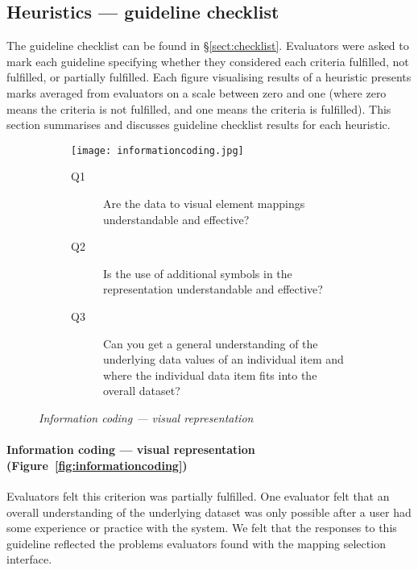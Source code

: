 \subsection{Heuristics --- guideline checklist}

The guideline checklist can be found in \S\ref{sect:checklist}. Evaluators were asked to mark each guideline specifying whether they considered each criteria fulfilled, not fulfilled, or partially fulfilled. Each figure visualising results of a heuristic presents marks averaged from  evaluators on a scale between zero and one (where zero means the criteria is not fulfilled, and one means the criteria is fulfilled). This section summarises and discusses guideline checklist results for each heuristic.

\begin{figure}[!htb]
\centering
\begin{subfigure}{.5\textwidth}
	\centering
	\texttt{[image: informationcoding.jpg]}
\end{subfigure}%
\begin{subfigure}{.5\textwidth}
  \begin{description}
	\item[Q1]Are the data to visual element mappings understandable and effective?
	\item[Q2]Is the use of additional symbols in the representation understandable and effective? 
	\item[Q3]Can you get a general understanding of the underlying data values of an individual item and where the individual data item fits into the overall dataset?
  \end{description}
\end{subfigure}
\caption{\textit{Information coding --- visual representation}}
\label{fig:informationcoding}
\end{figure}

\paragraph{Information coding --- visual representation (Figure~\vref{fig:informationcoding})}

Evaluators felt this criterion was partially fulfilled. One evaluator felt that an overall understanding of the underlying dataset was only possible after a user had some experience or practice with the system. We felt that the responses to this guideline reflected the problems evaluators found with the mapping selection interface. 

